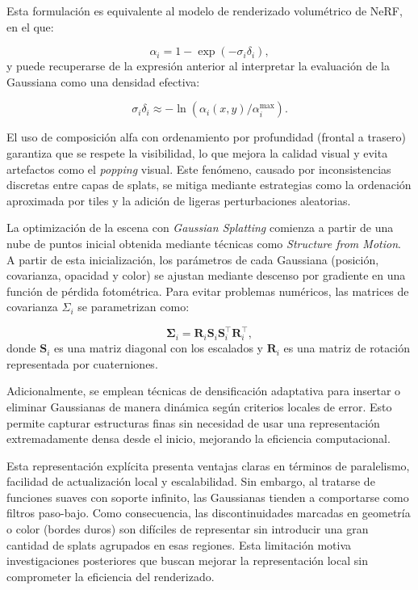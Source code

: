 Esta formulación es equivalente al modelo de renderizado volumétrico de NeRF, en el que:

\[
\alpha_i = 1 - \exp(-\sigma_i \delta_i),
\]
y puede recuperarse de la expresión anterior al interpretar la evaluación de la Gaussiana como una densidad efectiva:

\[
\sigma_i \delta_i \approx -\ln \left( \alpha_i(x,y)/\alpha_i^{\max} \right).
\]

El uso de composición alfa con ordenamiento por profundidad (frontal a trasero) garantiza que se respete la visibilidad, lo que mejora la calidad visual y evita artefactos como el \textit{popping} visual. Este fenómeno, causado por inconsistencias discretas entre capas de splats, se mitiga mediante estrategias como la ordenación aproximada por tiles y la adición de ligeras perturbaciones aleatorias.

La optimización de la escena con \textit{Gaussian Splatting} comienza a partir de una nube de puntos inicial obtenida mediante técnicas como \textit{Structure from Motion}. A partir de esta inicialización, los parámetros de cada Gaussiana (posición, covarianza, opacidad y color) se ajustan mediante descenso por gradiente en una función de pérdida fotométrica. Para evitar problemas numéricos, las matrices de covarianza $\Sigma_i$ se parametrizan como:

\[
\mathbf{\Sigma}_i = \mathbf{R}_i \mathbf{S}_i \mathbf{S}_i^\top \mathbf{R}_i^\top,
\]
donde $\mathbf{S}_i$ es una matriz diagonal con los escalados y $\mathbf{R}_i$ es una matriz de rotación representada por cuaterniones.

Adicionalmente, se emplean técnicas de densificación adaptativa para insertar o eliminar Gaussianas de manera dinámica según criterios locales de error. Esto permite capturar estructuras finas sin necesidad de usar una representación extremadamente densa desde el inicio, mejorando la eficiencia computacional.

Esta representación explícita presenta ventajas claras en términos de paralelismo, facilidad de actualización local y escalabilidad. Sin embargo, al tratarse de funciones suaves con soporte infinito, las Gaussianas tienden a comportarse como filtros paso-bajo. Como consecuencia, las discontinuidades marcadas en geometría o color (bordes duros) son difíciles de representar sin introducir una gran cantidad de splats agrupados en esas regiones. Esta limitación motiva investigaciones posteriores que buscan mejorar la representación local sin comprometer la eficiencia del renderizado.

